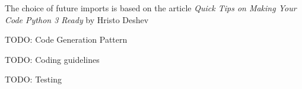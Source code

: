 \noindent The choice of future imports is based on the article \emph{Quick Tips
on Making Your Code Python 3 Ready} by Hristo Deshev \cite{deshev:2012}

\newpage
TODO: Code Generation Pattern

TODO: Coding guidelines

TODO: Testing
